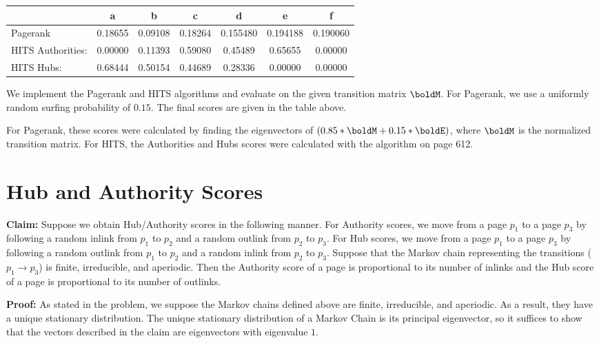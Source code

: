 \documentclass[11pt,letterpaper]{article}
\begin{document}
\begin{table}[h!]
\begin{center}
\begin{tabular}{l|c|c|c|c|c|c}
            & a    & b    & c    & d    & e    & f    \\ \hline
Pagerank    & 0.18655 & 0.09108 & 0.18264 & 0.155480 & 0.194188 & 0.190060 \\
HITS Authorities:  & 0.00000 & 0.11393 & 0.59080 & 0.45489 & 0.65655 & 0.00000 \\
HITS Hubs:         & 0.68444 & 0.50154 & 0.44689 & 0.28336 & 0.00000 & 0.00000
\end{tabular}
\end{center}
\end{table}

We implement the Pagerank and HITS algorithms and evaluate on the given transition matrix $\boldM$. For Pagerank, we use a uniformly random surfing probability of $0.15$. The final scores are given in the table above.

For Pagerank, these scores were calculated by finding the eigenvectors of $(0.85 * \boldM + 0.15 * \boldE)$, where $\boldM$ is the normalized transition matrix. For HITS, the Authorities and Hubs scores were calculated with the algorithm on page 612.

\section{Hub and Authority Scores}
\textbf{Claim: } Suppose we obtain Hub/Authority scores in the following manner. For Authority scores, we move from a page $p_1$ to a page $p_3$ by following a random inlink from $p_1$ to $p_2$ and a random outlink from $p_2$ to $p_3$. For Hub scores, we move from a page $p_1$ to a page $p_3$ by following a random outlink from $p_1$ to $p_2$ and a random inlink from $p_2$ to $p_3$. Suppose that the Markov chain representing the transitions ($p_1 \to p_3$) is finite, irreducible, and aperiodic. Then the Authority score of a page is proportional to its number of inlinks and the Hub score of a page is proportional to its number of outlinks.

\textbf{Proof: } As stated in the problem, we suppose the Markov chains defined above are finite, irreducible, and aperiodic. As a result, they have a unique stationary distribution. The unique stationary distribution of a Markov Chain is its principal eigenvector, so it suffices to show that the vectors described in the claim are eigenvectors with eigenvalue $1$.
\end{document}

